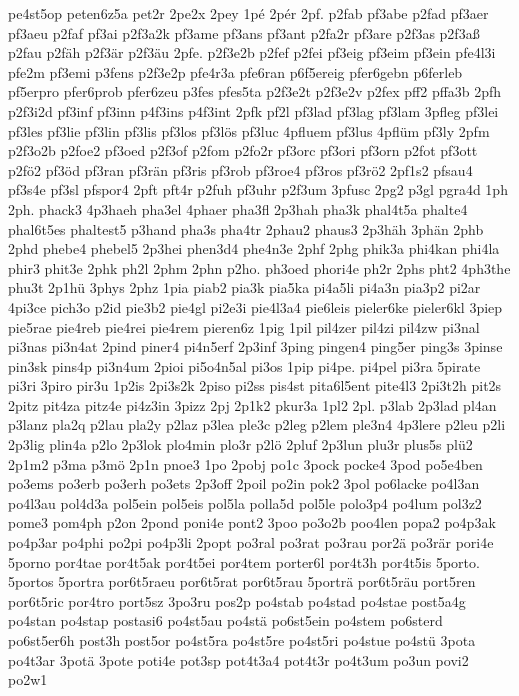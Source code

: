 {pe4st5op
peten6z5a
pet2r
2pe2x
2pey
1pé
2pér
2pf.
p2fab
pf3abe
p2fad
pf3aer
pf3aeu
p2faf
pf3ai
p2f3a2k
pf3ame
pf3ans
pf3ant
p2fa2r
pf3are
p2f3as
p2f3aß
p2fau
p2fäh
p2f3är
p2f3äu
2pfe.
p2f3e2b
p2fef
p2fei
pf3eig
pf3eim
pf3ein
pfe4l3i
pfe2m
pf3emi
p3fens
p2f3e2p
pfe4r3a
pfe6ran
p6f5ereig
pfer6gebn
p6ferleb
pf5erpro
pfer6prob
pfer6zeu
p3fes
pfes5ta
p2f3e2t
p2f3e2v
p2fex
pff2
pffa3b
2pfh
p2f3i2d
pf3inf
pf3inn
p4f3ins
p4f3int
2pfk
pf2l
pf3lad
pf3lag
pf3lam
3pfleg
pf3lei
pf3les
pf3lie
pf3lin
pf3lis
pf3los
pf3lös
pf3luc
4pfluem
pf3lus
4pflüm
pf3ly
2pfm
p2f3o2b
p2foe2
pf3oed
p2f3of
p2fom
p2fo2r
pf3orc
pf3ori
pf3orn
p2fot
pf3ott
p2fö2
pf3öd
pf3ran
pf3rän
pf3ris
pf3rob
pf3roe4
pf3ros
pf3rö2
2pf1s2
pfsau4
pf3s4e
pf3sl
pfspor4
2pft
pft4r
p2fuh
pf3uhr
p2f3um
3pfusc
2pg2
p3gl
pgra4d
1ph
2ph.
phack3
4p3haeh
pha3el
4phaer
pha3fl
2p3hah
pha3k
phal4t5a
phalte4
phal6t5es
phaltest5
p3hand
pha3s
pha4tr
2phau2
phaus3
2p3häh
3phän
2phb
2phd
phebe4
phebel5
2p3hei
phen3d4
phe4n3e
2phf
2phg
phik3a
phi4kan
phi4la
phir3
phit3e
2phk
ph2l
2phm
2phn
p2ho.
ph3oed
phori4e
ph2r
2phs
pht2
4ph3the
phu3t
2p1hü
3phys
2phz
1pia
piab2
pia3k
pia5ka
pi4a5li
pi4a3n
pia3p2
pi2ar
4pi3ce
pich3o
p2id
pie3b2
pie4gl
pi2e3i
pie4l3a4
pie6leis
pieler6ke
pieler6kl
3piep
pie5rae
pie4reb
pie4rei
pie4rem
pieren6z
1pig
1pil
pil4zer
pil4zi
pil4zw
pi3nal
pi3nas
pi3n4at
2pind
piner4
pi4n5erf
2p3inf
3ping
pingen4
ping5er
ping3s
3pinse
pin3sk
pins4p
pi3n4um
2pioi
pi5o4n5al
pi3os
1pip
pi4pe.
pi4pel
pi3ra
5pirate
pi3ri
3piro
pir3u
1p2is
2pi3s2k
2piso
pi2ss
pis4st
pita6l5ent
pite4l3
2pi3t2h
pit2s
2pitz
pit4za
pitz4e
pi4z3in
3pizz
2pj
2p1k2
pkur3a
1pl2
2pl.
p3lab
2p3lad
pl4an
p3lanz
pla2q
p2lau
pla2y
p2laz
p3lea
ple3c
p2leg
p2lem
ple3n4
4p3lere
p2leu
p2li
2p3lig
plin4a
p2lo
2p3lok
plo4min
plo3r
p2lö
2pluf
2p3lun
plu3r
plus5s
plü2
2p1m2
p3ma
p3mö
2p1n
pnoe3
1po
2pobj
po1c
3pock
pocke4
3pod
po5e4ben
po3ems
po3erb
po3erh
po3ets
2p3off
2poil
po2in
pok2
3pol
po6lacke
po4l3an
po4l3au
pol4d3a
pol5ein
pol5eis
pol5la
polla5d
pol5le
polo3p4
po4lum
pol3z2
pome3
pom4ph
p2on
2pond
poni4e
pont2
3poo
po3o2b
poo4len
popa2
po4p3ak
po4p3ar
po4phi
po2pi
po4p3li
2popt
po3ral
po3rat
po3rau
por2ä
po3rär
pori4e
5porno
por4tae
por4t5ak
por4t5ei
por4tem
porter6l
por4t3h
por4t5is
5porto.
5portos
5portra
por6t5raeu
por6t5rat
por6t5rau
5porträ
por6t5räu
port5ren
por6t5ric
por4tro
port5sz
3po3ru
pos2p
po4stab
po4stad
po4stae
post5a4g
po4stan
po4stap
postasi6
po4st5au
po4stä
po6st5ein
po4stem
po6sterd
po6st5er6h
post3h
post5or
po4st5ra
po4st5re
po4st5ri
po4stue
po4stü
3pota
po4t3ar
3potä
3pote
poti4e
pot3sp
pot4t3a4
pot4t3r
po4t3um
po3un
povi2
po2w1
}
